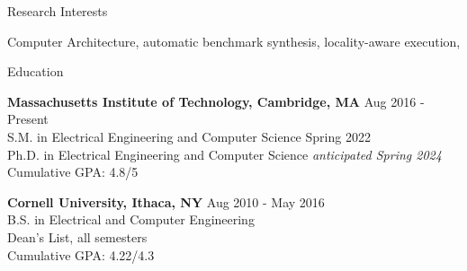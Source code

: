 \documentclass{resume} %
\begin{document}

\begin{rSection}{Research Interests}

Computer Architecture, automatic benchmark synthesis, locality-aware execution,

\end{rSection}


\begin{rSection}{Education}

{\bf Massachusetts Institute of Technology, Cambridge, MA} \hfill { Aug 2016 - Present} \\ 
S.M. in Electrical Engineering and Computer Science \hfill {Spring 2022} \\
Ph.D. in Electrical Engineering and Computer Science \hfill { \it{anticipated} Spring 2024} \\
Cumulative GPA: 4.8/5

{\bf Cornell University, Ithaca, NY} \hfill { Aug 2010 - May 2016} \\ 
B.S. in Electrical and Computer Engineering \\
Dean's List, all semesters \\
Cumulative GPA: 4.22/4.3 

\end{rSection}

\end{document}
